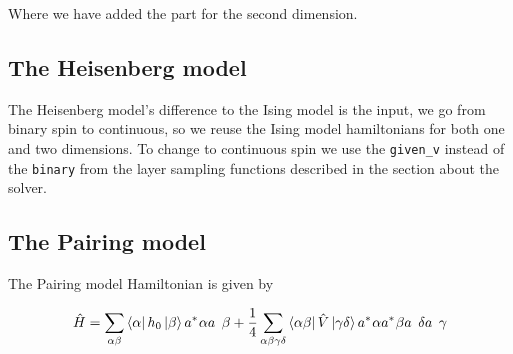 Where we have added the part for the second dimension.

\subsection{The Heisenberg model}

The Heisenberg model's difference to the Ising model is the input, we go from binary spin to continuous, so we reuse the Ising model hamiltonians for both one and two dimensions. To change to continuous spin we use the \texttt{given_v} instead of the \texttt{binary} from the layer sampling functions described in the section about the solver. 

\subsection{The Pairing model} \label{sec:pairing_imp}

The Pairing model Hamiltonian is given by

\begin{equation}
  \hat{H} = \sum_{\alpha\beta} \bra{\alpha}h_0\ket{\beta}\hc{a}{\alpha}\op{a}{\beta} + \frac{1}{4} \sum_{\alpha\beta\gamma\delta} \bra{\alpha\beta}\hat{V}\ket{\gamma\delta} \hc{a}{\alpha}\hc{a}{\beta}\op{a}{\delta}\op{a}{\gamma}
\end{equation}





